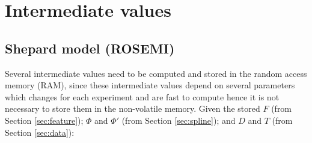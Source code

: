 \documentclass[12pt]{article}
\def\D{\displaystyle}
\begin{document}
\iffalse
&= \frac{\D \left(\sum_{k\in K} \frac{E_k + \sum_l \theta_{kl} \phi_{kl}(w)}{D_k(w)} / S_K(w)\right) - \left(E_j + \sum_l \theta_{jl} \phi_{jl}(w)\right)}{D_j(w)S_K(w)-1}, \\
\fi

\section{Intermediate values}
\label{sec:intermediate}

\subsection{Shepard model (ROSEMI)}
Several intermediate values need to be computed and stored in the random access memory (RAM), since these intermediate values depend on several parameters which changes for each experiment and are fast to compute hence it is not necessary to store them in the non-volatile memory. Given the stored $F$ (from Section \ref{sec:feature}); $\Phi$ and $\Phi'$ (from Section \ref{sec:spline}); and $D$ and $T$ (from Section \ref{sec:data}):
\end{document}
